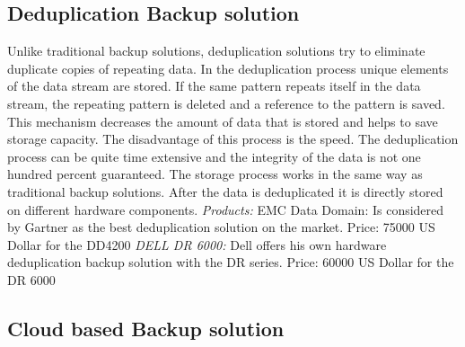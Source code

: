 \documentclass[12pt]{article}
\begin{document}
\subsection{Deduplication Backup solution}
Unlike traditional backup solutions, deduplication solutions try to eliminate duplicate copies of repeating data. In the deduplication process unique elements of the data stream are stored. If the same pattern repeats itself in the data stream, the repeating pattern is deleted and a reference to the  pattern is saved\cite{WikiDe}. This mechanism decreases the amount of data that is stored and helps to save storage capacity. The disadvantage of this process is the speed. The deduplication process can be quite time extensive and the integrity of the data is not one hundred percent guaranteed. The storage process works in the same way as traditional backup solutions. After the data is deduplicated it is directly stored on different hardware components.
\newline
\newline
\emph{Products:}
\newline
EMC Data Domain:
\newline
Is considered by Gartner\cite{Gart} as the best deduplication solution on the market.
\newline
\newline
Price: 75000 US Dollar for the DD4200
\newline
\newline
\emph{DELL DR 6000:}
\newline
Dell offers his own hardware deduplication backup solution with the DR series.
\newline
\newline
Price: 60000 US Dollar for the DR 6000 
\subsection{Cloud based Backup solution}
\end{document}
